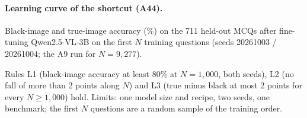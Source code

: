 \paragraph{Learning curve of the shortcut (A44).}
Black-image and true-image accuracy (\%) on the 711 held-out MCQs after fine-tuning Qwen2.5-VL-3B on the first $N$ training questions (seeds 20261003 / 20261004; the A9 run for $N=9{,}277$).
\begin{center}
\footnotesize
\setlength{\tabcolsep}{3pt}
\end{center}
Rules L1 (black-image accuracy at least 80\% at $N=1{,}000$, both seeds), L2 (no fall of more than 2 points along $N$) and L3 (true minus black at most 2 points for every $N\ge1{,}000$) hold.
Limits: one model size and recipe, two seeds, one benchmark; the first $N$ questions are a random sample of the training order.
